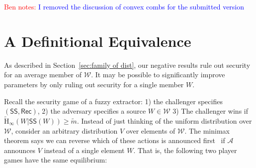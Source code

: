 \documentclass[11pt]{article}
\newcommand{\secref}[1]{\mbox{Section~\ref{#1}}}
\newcommand{\class}[1]{{\ensuremath{\mathsf{#1}}}}
\newcommand{\sketch}{\ensuremath{\class{SS}}\xspace}
\newcommand{\rec}{\ensuremath{\class{Rec}}\xspace}
\newcommand{\Hoo}{\mathrm{H}_\infty}
\newcommand{\Hav}{\tilde{\mathrm{H}}_\infty}
\newcommand{\Hfuzz}{\mathrm{H}^{\mathtt{fuzz}}_{t,\infty}}
\newcommand{\authnote}[2]{{\textcolor{red}{\textsf{#1 notes: }\textcolor{blue}{ #2}}\marginpar{\textcolor{red}{\textbf{!!!!!}}}}}
\newcommand{\authnote}[2]{}
\newcommand{\bnote}[1]{{\authnote{Ben}{#1}}}
\begin{document}
%
%
%
\bnote{I removed the discussion of convex combs for the submitted version}

\section{A Definitional Equivalence}
\label{sec:def equiv}

As described in \secref{sec:family of dist}, our negative results rule out security for an average member of $\mathcal{W}$.  It may be possible to significantly improve parameters by only ruling out security for a single member $W$.  

Recall the security game of a fuzzy extractor: 1) the challenger specifies $(\sketch, \rec)$, 2) the adversary specifies a source $W\in \mathcal{W}$ 3) The challenger wins if $\Hav(W|\sketch(W))\ge \tilde{m}$.  Instead of just thinking of the uniform distribution over $\mathcal{W}$, consider an arbitrary distribution $V$ over elements of $\mathcal{W}$.  The minimax theorem says we can reverse which of these actions is announced first~\cite{neumann1928theorie} if $\mathcal{A}$ announces $V$ instead of a single element $W$.  That is, the following two player games have the same equilibrium:
\end{document}

